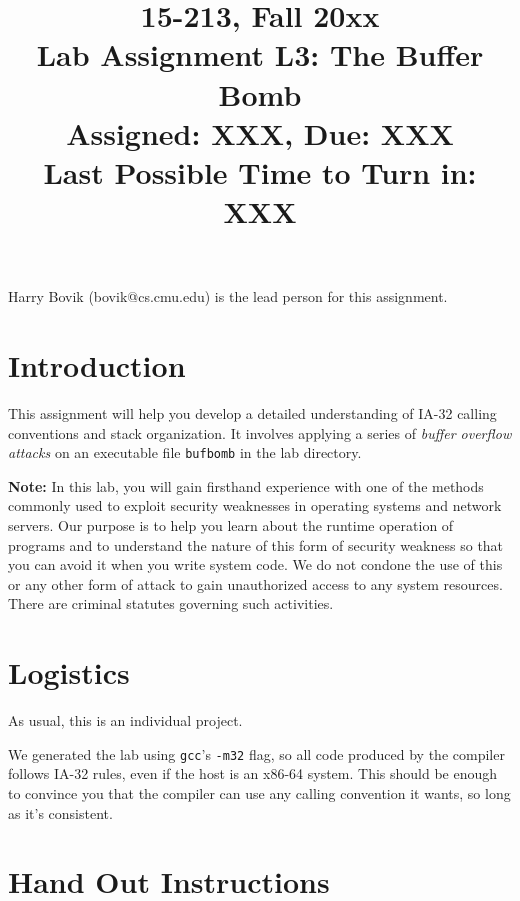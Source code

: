 \documentclass[11pt]{article}
\begin{document}
\title{15-213, Fall 20xx\\
Lab Assignment L3: The Buffer Bomb\\
Assigned: XXX, Due: XXX\\
Last Possible Time to Turn in: XXX
}

\author{}
\date{}

\maketitle



Harry Bovik (bovik@cs.cmu.edu) is the lead person for
this assignment.


\section*{Introduction}

This assignment will help you develop a detailed understanding of
IA-32 calling conventions and stack organization.  It involves
applying a series of {\em buffer overflow attacks} on an executable
file {\tt bufbomb} in the lab directory.

{\bf Note:} In this lab, you will gain firsthand experience with one
of the methods commonly used to exploit security weaknesses in
operating systems and network servers.  Our purpose is to help you
learn about the runtime operation of programs and to understand the
nature of this form of security weakness so that you can avoid it when
you write system code.  We do not condone the use of this or any other
form of attack to gain unauthorized access to any system resources.
There are criminal statutes governing such activities. 


\section*{Logistics}

As usual, this is an individual project.

We generated the lab using {\tt gcc}'s {\tt -m32} flag, so all code
produced by the compiler follows IA-32 rules, even if the host is an
x86-64 system. This should be enough to convince you that the compiler
can use any calling convention it wants, so long as it's consistent.


\section*{Hand Out Instructions}
\end{document}
